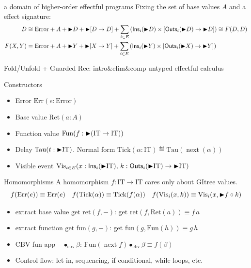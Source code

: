 \documentclass[8pt]{beamer}
\newcommand{\Error}{\mathrm{Error}}
\newcommand{\Ins}{\mathsf{Ins}}
\newcommand{\Outs}{\mathsf{Outs}}
\newcommand{\IT}{\mathrm{IT}}
\newcommand{\gRet}{\mathrm{Ret}}
\newcommand{\gErr}{\mathrm{Err}}
\newcommand{\gTau}{\mathrm{Tau}}
\newcommand{\gVis}{\mathrm{Vis}}
\newcommand{\gFun}{\mathrm{Fun}}
\newcommand{\Tick}{\mathrm{Tick}}
\DeclareMathOperator*{\Next}{\mathrm{next}}
\newcommand{\getret}{\mathrm{get\_ret}}
\newcommand{\getfun}{\mathrm{get\_fun}}
\newcommand{\cbvap}{\bullet_{\text{cbv}}}
\begin{document}
  \begin{frame}[allowframebreaks]{a domain of higher-order effectful programs}
    Fixing the set of base values \(A\) and a effect signature:
    \begin{align*}
      D & \cong \Error + A + \latert D + \latert [D \to D] + \sum_{i\in E} \left( \Ins_i(\latert D) \times [\Outs_i(\latert D) \to \latert D] \right) \cong F(D,D) \\
      F(X,Y) & = \Error + A + \latert Y + \latert [X \to Y] + \sum_{i\in E} \left( \Ins_i(\latert Y) \times [\Outs_i(\latert X) \to \latert Y] \right)
    \end{align*}

    Fold/Unfold + Guarded Rec: intro\&elim\&comp untyped effectful calculus
    \begin{block}{Constructors}
      \begin{itemize}
        \item Error \(\gErr(e : \Error)\)
        \item Base value \(\gRet(a : A)\)
        \item Function value \(\gFun(f : \latert (\IT \to \IT))\)
        \item Delay \(\gTau(t : \latert \IT)\). Normal form \(\Tick(\alpha : \IT) \eqdef \gTau(\Next(\alpha))\)
        \item Visible event \(\gVis_{i \in E}(x: \Ins_i(\latert \IT),\,k : \Outs_i(\latert \IT) \to \latert \IT)\)
      \end{itemize}
    \end{block}

    \framebreak

    \begin{block}{Homomorphisms}
      A homomorphism \(f : \IT \to \IT\) cares only about GItree values.
      \[
        f(\gErr(e)) \equiv \gErr(e)
        \quad
        f(\Tick(\alpha)) \equiv \Tick(f(\alpha))
        \quad
        f(\gVis_i(x,k)) \equiv \gVis_i (x, \latert f \circ k)
      \]
      \begin{itemize}
        \item extract base value \(\getret(f,-)\): \(\getret(f,\gRet(a)) \equiv f\,a\)
        \item extract function \(\getfun(g,-)\): \(\getfun(g,\gFun(h)) \equiv g\,h\)
        \item CBV fun app \(- \cbvap \beta\): \(\gFun(\Next f) \cbvap \beta \equiv f(\beta)\)
        \item Control flow: let-in, sequencing, if-conditional, while-loops, etc.
      \end{itemize}
    \end{block}
  \end{frame}
\end{document}
